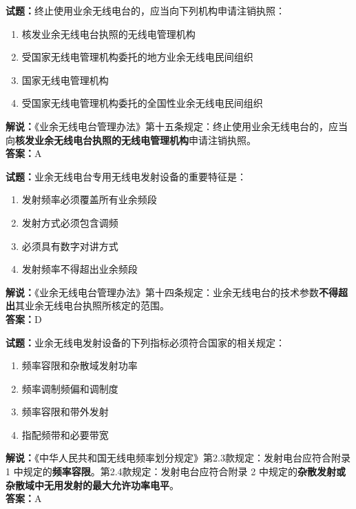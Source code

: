 \documentclass{ctexbook}
\begin{document}
\bigskip

\noindent\textbf{试题：}终止使用业余无线电台的，应当向下列机构申请注销执照：
\begin{enumerate}[leftmargin=3em]
  \item 核发业余无线电台执照的无线电管理机构
  \item 受国家无线电管理机构委托的地方业余无线电民间组织
  \item 国家无线电管理机构
  \item 受国家无线电管理机构委托的全国性业余无线电民间组织
\end{enumerate}
\noindent\textbf{解说：}《业余无线电台管理办法》第十五条规定：终止使用业余无线电台的，应当向\textbf{核发业余无线电台执照的无线电管理机构}申请注销执照。\\\noindent\textbf{答案：}A

\bigskip

\noindent\textbf{试题：}业余无线电台专用无线电发射设备的重要特征是：
\begin{enumerate}[leftmargin=3em]
  \item 发射频率必须覆盖所有业余频段
  \item 发射方式必须包含调频
  \item 必须具有数字对讲方式
  \item 发射频率不得超出业余频段
\end{enumerate}
\noindent\textbf{解说：}《业余无线电台管理办法》第十四条规定：业余无线电台的技术参数\textbf{不得超出}其业余无线电台执照所核定的范围。\\\noindent\textbf{答案：}D

\bigskip

\noindent\textbf{试题：}业余无线电发射设备的下列指标必须符合国家的相关规定：
\begin{enumerate}[leftmargin=3em]
  \item 频率容限和杂散域发射功率
  \item 频率调制频偏和调制度
  \item 频率容限和带外发射
  \item 指配频带和必要带宽
\end{enumerate}
\noindent\textbf{解说：}《中华人民共和国无线电频率划分规定》第2.3款规定：发射电台应符合附录 1 中规定的\textbf{频率容限}。第2.4款规定：发射电台应符合附录 2 中规定的\textbf{杂散发射或杂散域中无用发射的最大允许功率电平}。\\\noindent\textbf{答案：}A

\bigskip
\end{document}
